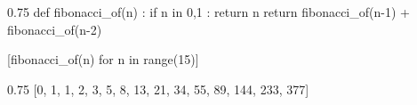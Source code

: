\documentclass[english,11pt,a4paper]{article}
\begin{document}
\SetJupyterParSkip{\baselineskip}
\setcounter{JupyterIn}{14}

\hrulefill

\begin{NotebookIn}{0.75\linewidth}
def fibonacci_of(n) :
	if n in {0,1} :
		return n
	return fibonacci_of(n-1) + fibonacci_of(n-2)

[fibonacci_of(n) for n in range(15)]
\end{NotebookIn}

\begin{NotebookOut}{0.75\linewidth}
[0, 1, 1, 2, 3, 5, 8, 13, 21, 34, 55, 89, 144, 233, 377]
\end{NotebookOut}
\end{document}
